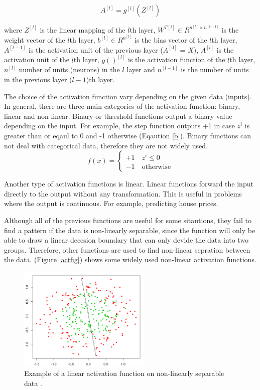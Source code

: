\documentclass[runningheads]{llncs}
\begin{document}
\begin{equation}
    \label{zeq2}
        A^{[l]} = g^{[l]}(Z^{[l]})
\end{equation}

where $Z^{[l]}$ is the linear mapping of the $l$th layer, $W^{T[l]} \in R^{n^{[l]} \times n^{[l-1]}}$ is the weight vector of the 
$l$th layer, $b^{[l]} \in R^{n^{[l]}}$ is the bias vector of the $l$th layer, $A^{[l-1]}$ is the activation unit
of the previous layer ($A^{[0]}$ = $X$), $A^{[l]}$ is the activation unit of the $l$th layer, 
$g()^{[l]}$ is the activation function of the $l$th layer, $n^{[l]}$ number of units (neurons) in the $l$ layer
and $n^{[l-1]}$ is the number of units in the previous layer ($l - 1$)th layer.


The choice of the activation function vary depending on the given data (inputs). 
In general, 
there are three main categories of the activation function: binary, linear and non-linear. 
Binary or threshold functions output a binary value depending on the input. 
For example, the step function outputs +1 in case $z^i$ is greater than or eqaul to 0 and -1 otherwise (Eqaution \ref{b}).
Binary functions can not deal with categorical data, therefore they are not widely used.
\begin{equation}
    \label{b}
f(x) = \left\{ \begin{array}{ll} +1 \quad z^i \leq 0 \\ -1 \quad \text{otherwise} \end{array} \right.
\end{equation}

Another type of activation functions is linear. 
Linear functions forward the input directly to the output without any transformation.
This is useful in problems where the output is continuous. For example, predicting house prices.

Although all of the previous functions are useful for some sitautions, 
they fail to find a pattern if the data is non-linearly separable, 
since the function will only be able to draw a linear decesion boundary that can only devide the data into two groups.
Therefore, other functions are used to find non-linear sepration between the data. 
(Figure \ref{actfig}) shows some widely used non-linear activation functions.

\begin{figure}[H]
    \label{nls}
    \centering
    \includegraphics[height=5cm]{linear}
    \caption{Example of a linear activation function on non-linearly separable data \cite{nonsep}. }
\end{figure}
\end{document}
